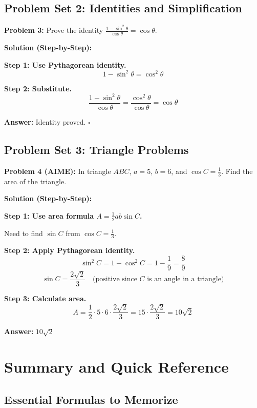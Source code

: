 \documentclass[12pt]{extarticle}
\begin{document}
\subsection{Problem Set 2: Identities and Simplification}

\begin{examplebox}
\textbf{Problem 3:} Prove the identity $\frac{1 - \sin^2\theta}{\cos\theta} = \cos\theta$.

\textbf{Solution (Step-by-Step):}

\textbf{Step 1: Use Pythagorean identity.}
\[
1 - \sin^2\theta = \cos^2\theta
\]

\textbf{Step 2: Substitute.}
\[
\frac{1 - \sin^2\theta}{\cos\theta} = \frac{\cos^2\theta}{\cos\theta} = \cos\theta
\]

\textbf{Answer:} Identity proved. $\square$
\end{examplebox}

\subsection{Problem Set 3: Triangle Problems}

\begin{examplebox}
\textbf{Problem 4 (AIME):} In triangle $ABC$, $a = 5$, $b = 6$, and $\cos C = \frac{1}{3}$. Find the area of the triangle.

\textbf{Solution (Step-by-Step):}

\textbf{Step 1: Use area formula $A = \frac{1}{2}ab\sin C$.}

Need to find $\sin C$ from $\cos C = \frac{1}{3}$.

\textbf{Step 2: Apply Pythagorean identity.}
\[
\sin^2 C = 1 - \cos^2 C = 1 - \frac{1}{9} = \frac{8}{9}
\]
\[
\sin C = \frac{2\sqrt{2}}{3} \quad \text{(positive since $C$ is an angle in a triangle)}
\]

\textbf{Step 3: Calculate area.}
\[
A = \frac{1}{2} \cdot 5 \cdot 6 \cdot \frac{2\sqrt{2}}{3} = 15 \cdot \frac{2\sqrt{2}}{3} = 10\sqrt{2}
\]

\textbf{Answer:} $\boxed{10\sqrt{2}}$
\end{examplebox}

\section{Summary and Quick Reference}

\subsection{Essential Formulas to Memorize}
\end{document}

